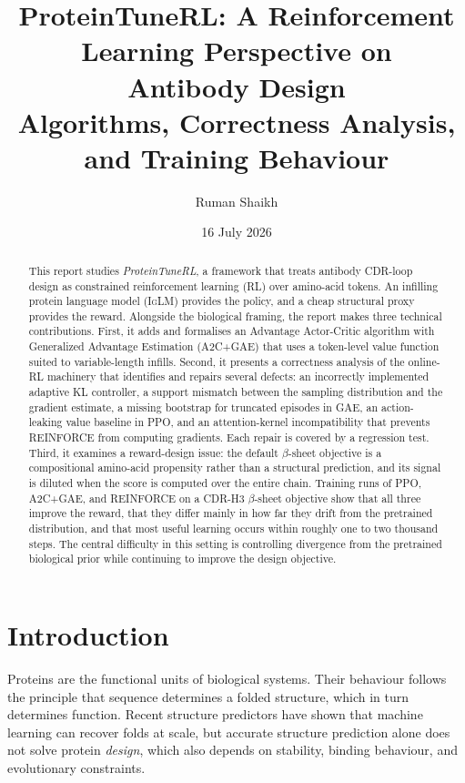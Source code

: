 \documentclass[11pt]{article}
\title{\textbf{ProteinTuneRL: A Reinforcement Learning Perspective on\\ Antibody Design}\\[4pt]
\large Algorithms, Correctness Analysis, and Training Behaviour}
\author{Ruman Shaikh}
\date{16 July 2026}
\newcommand{\iglm}{\textsc{IgLM}}
\begin{document}
\maketitle

\begin{abstract}
This report studies \emph{ProteinTuneRL}, a framework that treats antibody
CDR-loop design as constrained reinforcement learning (RL) over amino-acid
tokens. An infilling protein language model (\iglm) provides the policy, and a
cheap structural proxy provides the reward. Alongside the biological framing, the
report makes three technical contributions. First, it adds and formalises an
Advantage Actor-Critic algorithm with Generalized Advantage Estimation (A2C+GAE)
that uses a token-level value function suited to variable-length infills. Second,
it presents a correctness analysis of the online-RL machinery that identifies and
repairs several defects: an incorrectly implemented adaptive KL controller, a
support mismatch between the sampling distribution and the gradient estimate, a
missing bootstrap for truncated episodes in GAE, an action-leaking value baseline
in PPO, and an attention-kernel incompatibility that prevents REINFORCE from
computing gradients. Each repair is covered by a regression test. Third, it
examines a reward-design issue: the default $\beta$-sheet objective is a
compositional amino-acid propensity rather than a structural prediction, and its
signal is diluted when the score is computed over the entire chain. Training runs
of PPO, A2C+GAE, and REINFORCE on a CDR-H3 $\beta$-sheet objective show that all
three improve the reward, that they differ mainly in how far they drift from the
pretrained distribution, and that most useful learning occurs within roughly one
to two thousand steps. The central difficulty in this setting is controlling
divergence from the pretrained biological prior while continuing to improve the
design objective.
\end{abstract}

\section{Introduction}
Proteins are the functional units of biological systems. Their behaviour follows
the principle that sequence determines a folded structure, which in turn
determines function. Recent structure predictors have shown that machine learning
can recover folds at scale, but accurate structure prediction alone does not solve
protein \emph{design}, which also depends on stability, binding behaviour, and
evolutionary constraints.
\end{document}
